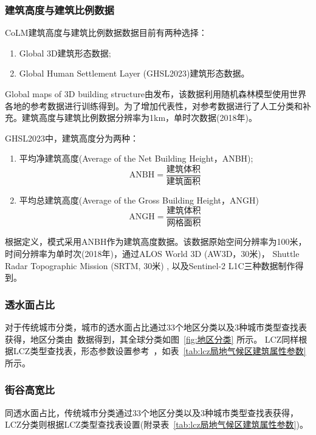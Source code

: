 \subsubsection{建筑高度与建筑比例数据}\label{建筑高度与比例}
CoLM建筑高度与建筑比例数据数据目前有两种选择：
\begin{enumerate}
  \item Global 3D建筑形态数据;
  \item Global Human Settlement Layer (GHSL2023)建筑形态数据。
\end{enumerate}
%
Global maps of 3D building structure由\citet{li2022global}发布，该数据利用随机森林模型使用世界各地的参考数据进行训练得到。为了增加代表性，\citet{li2022global}对参考数据进行了人工分类和补充。建筑高度与建筑比例数据分辨率为1km，单时次数据(2018年)。

GHSL2023中，建筑高度分为两种：
\begin{enumerate}
  \item 平均净建筑高度(Average of the Net Building Height，ANBH);
    \begin{equation}\label{ANBH}
      \mathrm{ANBH}=\frac{\mbox{建筑体积}}{\mbox{建筑面积}}
    \end{equation}
  \item 平均总建筑高度(Average of the Gross Building Height，ANGH)
    \begin{equation}
      \mathrm{ANGH}=\frac{\mbox{建筑体积}}{\mbox{网格面积}}
    \end{equation}
\end{enumerate}
根据定义，模式采用ANBH作为建筑高度数据。该数据原始空间分辨率为100米，时间分辨率为单时次(2018年)，通过ALOS World 3D (AW3D，30米)， Shuttle Radar Topographic Mission (SRTM, 30米) , 以及Sentinel-2 L1C三种数据制作得到。
%

\subsubsection{透水面占比}\label{透水面占比}
对于传统城市分类，城市的透水面占比通过33个地区分类以及3种城市类型查找表获得，地区分类由~\citet{oleson2020parameterization}数据得到，其全球分类如图~\ref{fig:地区分类} 所示。
LCZ同样根据LCZ类型查找表，形态参数设置参考~\citet{stewart2014evaluation}，如表~\ref{tab:lcz局地气候区建筑属性参数} 所示。

\subsubsection{街谷高宽比}\label{街谷高宽比}
同透水面占比，传统城市分类通过33个地区分类以及3种城市类型查找表获得，LCZ分类则根据LCZ类型查找表设置(附录表~\ref{tab:lcz局地气候区建筑属性参数})。

